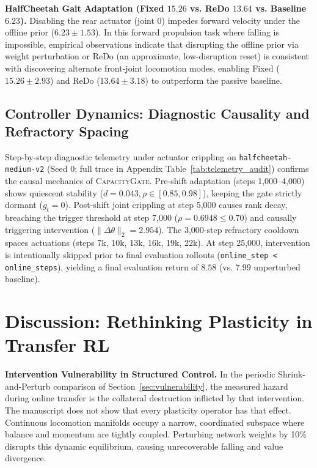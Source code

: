 \documentclass{article}
\begin{document}
\textbf{HalfCheetah Gait Adaptation (Fixed $15.26$ vs. ReDo $13.64$ vs. Baseline $6.23$).} Disabling the rear actuator (joint 0) impedes forward velocity under the offline prior ($6.23 \pm 1.53$). In this forward propulsion task where falling is impossible, empirical observations indicate that disrupting the offline prior via weight perturbation or ReDo (an approximate, low-disruption reset) is consistent with discovering alternate front-joint locomotion modes, enabling Fixed ($15.26 \pm 2.93$) and ReDo ($13.64 \pm 3.18$) to outperform the passive baseline.

\subsection{Controller Dynamics: Diagnostic Causality and Refractory Spacing}
\label{sec:telemetry}

Step-by-step diagnostic telemetry under actuator crippling on \texttt{halfcheetah-medium-v2} (Seed 0; full trace in Appendix Table~\ref{tab:telemetry_audit}) confirms the causal mechanics of \textsc{CapacityGate}. Pre-shift adaptation (steps 1,000--4,000) shows quiescent stability ($d = 0.043, \rho \in [0.85, 0.98]$), keeping the gate strictly dormant ($g_t = 0$). Post-shift joint crippling at step 5,000 causes rank decay, breaching the trigger threshold at step 7,000 ($\rho = 0.6948 \le 0.70$) and causally triggering intervention ($\|\Delta \theta\|_2 = 2.954$). The 3,000-step refractory cooldown spaces actuations (steps 7k, 10k, 13k, 16k, 19k, 22k). At step 25,000, intervention is intentionally skipped prior to final evaluation rollouts (\texttt{online\_step < online\_steps}), yielding a final evaluation return of $8.58$ (vs. $7.99$ unperturbed baseline).

\section{Discussion: Rethinking Plasticity in Transfer RL}
\label{sec:discussion}

\textbf{Intervention Vulnerability in Structured Control.} In the periodic Shrink-and-Perturb comparison of Section~\ref{sec:vulnerability}, the measured hazard during online transfer is the collateral destruction inflicted by that intervention. The manuscript does not show that every plasticity operator has that effect. Continuous locomotion manifolds occupy a narrow, coordinated subspace where balance and momentum are tightly coupled. Perturbing network weights by 10\% disrupts this dynamic equilibrium, causing unrecoverable falling and value divergence.
\end{document}
